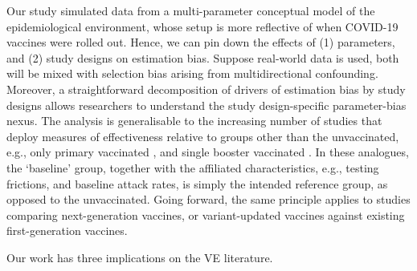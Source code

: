 \documentclass[12pt]{article}
\begin{document}
Our study simulated data from a multi-parameter conceptual model of the epidemiological environment, whose setup is more reflective of when COVID-19 vaccines were rolled out. Hence, we can pin down the effects of (1) parameters, and (2) study designs on estimation bias. Suppose real-world data is used, both will be mixed with selection bias arising from multidirectional confounding. Moreover, a straightforward decomposition of drivers of estimation bias by study designs allows researchers to understand the study design-specific parameter-bias nexus. The analysis is generalisable to the increasing number of studies that deploy measures of effectiveness relative to groups other than the unvaccinated, e.g., only primary vaccinated \citep{suah2022real, bar2021protection, ranzani2022effectiveness}, and single booster vaccinated \citep{regev2022efficacy}. In these analogues, the `baseline' group, together with the affiliated characteristics, e.g., testing frictions, and baseline attack rates, is simply the intended reference group, as opposed to the unvaccinated. Going forward, the same principle applies to studies comparing next-generation vaccines, or variant-updated vaccines against existing first-generation vaccines.

Our work has three implications on the VE literature. 
\end{document}
